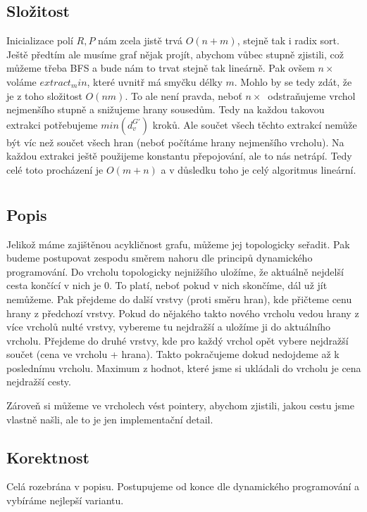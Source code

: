 \documentclass[a4paper]{article}
\begin{document}
\subsection{Složitost}
Inicializace polí $R, P$ nám zcela jistě trvá $O(n+m)$, stejně tak i radix sort. Ještě předtím ale musíme graf nějak projít, abychom vůbec stupně zjistili, což můžeme třeba BFS a bude nám to trvat stejně tak lineárně. Pak ovšem $n \times \ $ voláme $extract_min$, které uvnitř má smyčku délky $m$. Mohlo by se tedy zdát, že je z toho složitost $O(nm)$. To ale není pravda, neboť $n \times \ $ odstraňujeme vrchol nejmenšího stupně a snižujeme hrany sousedům. Tedy na každou takovou extrakci potřebujeme $min(d_v^{G'})$ kroků. Ale součet všech těchto extrakcí nemůže být víc než součet všech hran (neboť počítáme hrany nejmenšího vrcholu). Na každou extrakci ještě použijeme konstantu přepojování, ale to nás netrápí. Tedy celé toto procházení je $O(m+n)$ a v důsledku toho je celý algoritmus lineární.

\section{}
\subsection{Popis}
Jelikož máme zajištěnou acykličnost grafu, můžeme jej topologicky seřadit. Pak budeme postupovat zespodu směrem nahoru dle principů dynamického programování. Do vrcholu topologicky nejnižšího uložíme, že aktuálně nejdelší cesta končící v nich je 0. To platí, neboť pokud v nich skončíme, dál už jít nemůžeme. Pak přejdeme do další vrstvy (proti směru hran), kde přičteme cenu hrany z předchozí vrstvy. Pokud do nějakého takto nového vrcholu vedou hrany z více vrcholů nulté vrstvy, vybereme tu nejdražší a uložíme ji do aktuálního vrcholu. Přejdeme do druhé vrstvy, kde pro každý vrchol opět vybere nejdražší součet (cena ve vrcholu + hrana). Takto pokračujeme dokud nedojdeme až k poslednímu vrcholu. Maximum z hodnot, které jsme si ukládali do vrcholu je cena nejdražší cesty.

Zároveň si můžeme ve vrcholech vést pointery, abychom zjistili, jakou cestu jsme vlastně našli, ale to je jen implementační detail.

\subsection{Korektnost}
Celá rozebrána v popisu. Postupujeme od konce dle dynamického programování a vybíráme nejlepší variantu.
\end{document}

